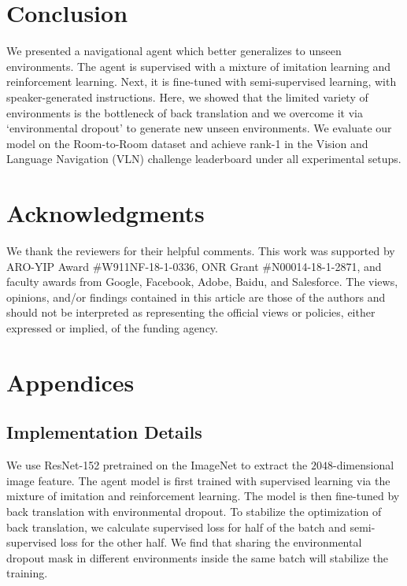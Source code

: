 \documentclass[11pt,a4paper]{article}
\begin{document}
\section{Conclusion}
We presented a navigational agent which better generalizes to unseen environments.
The agent is supervised with a mixture of imitation learning and reinforcement learning.
Next, it is fine-tuned with semi-supervised learning, with speaker-generated instructions. Here, we showed that the limited variety of environments is the bottleneck of back translation and we overcome it via `environmental dropout' to generate new unseen environments.
We evaluate our model on the Room-to-Room dataset and  achieve rank-1 in the Vision and Language Navigation (VLN) challenge leaderboard under all experimental setups. 


\section*{Acknowledgments}
We thank the reviewers for their helpful comments. 
This work was supported by ARO-YIP Award \#W911NF-18-1-0336, ONR Grant \#N00014-18-1-2871, and faculty awards from Google, Facebook, Adobe, Baidu, and Salesforce. The views, opinions, and/or findings contained in this article are those of the authors and should not be interpreted as representing the official views or policies, either expressed or implied, of the funding agency.




\appendix

\section{Appendices}
\subsection{Implementation Details}
We use ResNet-152 \cite{he2016deep} pretrained on the ImageNet \cite{russakovsky2015imagenet} to extract the $2048$-dimensional image feature. 
The agent model is first trained with supervised learning via the mixture of imitation and reinforcement learning. 
The model is then fine-tuned by back translation with environmental dropout. 
To stabilize the optimization of back translation, we calculate supervised loss for half of the batch and semi-supervised loss for the other half.
We find that sharing the environmental dropout mask in different environments inside the same batch will stabilize the training.
\end{document}
